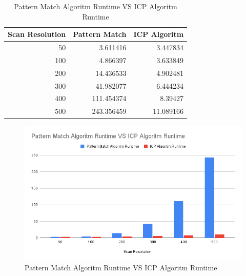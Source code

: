\documentclass[conference]{IEEEtran}
\begin{document}
\begin{table}[htbp]
\caption{Pattern Match Algoritm Runtime VS ICP Algoritm Runtime}
\begin{center}
\begin{tabular}{|r|r|r|}
\hline
\multicolumn{1}{|l|}{Scan Resolution} & \multicolumn{1}{l|}{Pattern Match} & \multicolumn{1}{l|}{ICP Algoritm} \\ \hline
50                                    & 3.611416                                            & 3.447834                                  \\ \hline
100                                   & 4.866397                                            & 3.633849                                  \\ \hline
200                                   & 14.436533                                           & 4.902481                                  \\ \hline
300                                   & 41.982077                                           & 6.444234                                  \\ \hline
400                                   & 111.454374                                          & 8.39427                                   \\ \hline
500                                   & 243.356459                                          & 11.089166                                 \\ \hline
\end{tabular}
\label{tab2}
\end{center}
\end{table}

\begin{figure}[htbp]
\centerline{\includegraphics[width=\linewidth]{../result/Pattern_Match_Algoritm_Runtime_VS_ICP_Algoritm_Runtime.png}}
\caption{Pattern Match Algoritm Runtime VS ICP Algoritm Runtime}
\label{RuntimeFig}
\end{figure}
\end{document}
